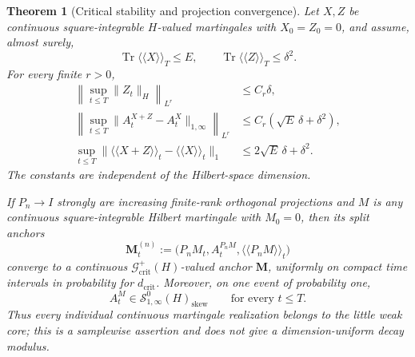 \documentclass[10pt,reqno]{amsart}
\theoremstyle{plain}
\newtheorem{theorem}{Theorem}[section]
\theoremstyle{definition}
\theoremstyle{remark}
\begin{document}
\begin{theorem}[Critical stability and projection convergence]
\label{cc:thm-critical-projection-stability}
Let \(X,Z\) be continuous square-integrable \(H\)-valued martingales with
\(X_0=Z_0=0\), and assume, almost surely,
\[
 \operatorname{Tr}\langle\!\langle X\rangle\!\rangle_T\leq E,
 \qquad
 \operatorname{Tr}\langle\!\langle Z\rangle\!\rangle_T\leq\delta^2.
\]
For every finite \(r>0\),
\begin{align}
 \left\|\sup_{t\leq T}\|Z_t\|_H\right\|_{L^r}
 &\leq C_r\delta,
 \label{cc:eq-critical-stability-first}\\
 \left\|\sup_{t\leq T}
 \|A_t^{X+Z}-A_t^X\|_{1,\infty}\right\|_{L^r}
 &\leq C_r(\sqrt E\,\delta+\delta^2),
 \label{cc:eq-critical-stability-area}\\
 \sup_{t\leq T}
 \|\langle\!\langle X+Z\rangle\!\rangle_t
     -\langle\!\langle X\rangle\!\rangle_t\|_1
 &\leq2\sqrt E\,\delta+\delta^2.
 \label{cc:eq-critical-stability-bracket}
\end{align}
The constants are independent of the Hilbert-space dimension.

If \(P_n\to I\) strongly are increasing finite-rank orthogonal
projections and \(M\) is any continuous square-integrable Hilbert
martingale with \(M_0=0\), then its split anchors
\[
 \mathbf M_t^{(n)}
 :=\bigl(P_nM_t,A_t^{P_nM},
        \langle\!\langle P_nM\rangle\!\rangle_t\bigr)
\]
converge to a continuous
\(\mathscr G^+_{\mathrm{crit}}(H)\)-valued anchor \(\mathbf M\), uniformly
on compact time intervals in probability for \(d_{\mathrm{crit}}\).
Moreover, on one event of probability one,
\begin{equation}
 A_t^M\in\mathcal S^0_{1,\infty}(H)_{\mathrm{skew}}
 \qquad\text{for every }t\leq T.
 \label{cc:eq-individual-little-weak}
\end{equation}
Thus every individual continuous martingale realization belongs to the
little weak core; this is a samplewise assertion and does not give a
dimension-uniform decay modulus.
\end{theorem}
\end{document}
